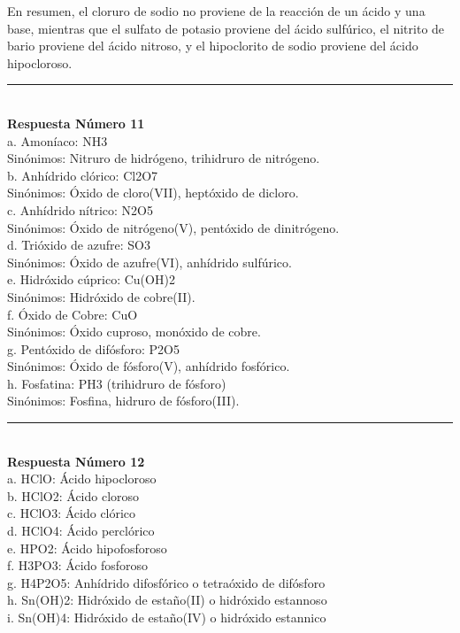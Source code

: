 \documentclass{article}
\begin{document}
En resumen, el cloruro de sodio no proviene de la reacción de un ácido y una base, mientras que el sulfato de potasio proviene del ácido sulfúrico, el nitrito de bario proviene del ácido nitroso, y el hipoclorito de sodio proviene del ácido hipocloroso.\\
\noindent\rule{\textwidth}{1pt} \\
\textbf{Respuesta Número 11} \\
a. Amoníaco: NH3\\
Sinónimos: Nitruro de hidrógeno, trihidruro de nitrógeno.\\
b. Anhídrido clórico: Cl2O7\\
Sinónimos: Óxido de cloro(VII), heptóxido de dicloro.\\
c. Anhídrido nítrico: N2O5\\
Sinónimos: Óxido de nitrógeno(V), pentóxido de dinitrógeno.\\
d. Trióxido de azufre: SO3\\
Sinónimos: Óxido de azufre(VI), anhídrido sulfúrico.\\
e. Hidróxido cúprico: Cu(OH)2\\
Sinónimos: Hidróxido de cobre(II).\\
f. Óxido de Cobre: CuO\\
Sinónimos: Óxido cuproso, monóxido de cobre.\\
g. Pentóxido de difósforo: P2O5\\
Sinónimos: Óxido de fósforo(V), anhídrido fosfórico.\\
h. Fosfatina: PH3 (trihidruro de fósforo)\\
Sinónimos: Fosfina, hidruro de fósforo(III).\\
\noindent\rule{\textwidth}{1pt} \\
\textbf{Respuesta Número 12} \\
a. HClO: Ácido hipocloroso\\
b. HClO2: Ácido cloroso\\
c. HClO3: Ácido clórico\\
d. HClO4: Ácido perclórico\\
e. HPO2: Ácido hipofosforoso\\
f. H3PO3: Ácido fosforoso\\
g. H4P2O5: Anhídrido difosfórico o tetraóxido de difósforo\\
h. Sn(OH)2: Hidróxido de estaño(II) o hidróxido estannoso\\
i. Sn(OH)4: Hidróxido de estaño(IV) o hidróxido estannico\\
\end{document}
